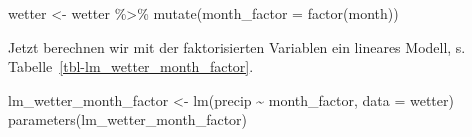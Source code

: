 \documentclass[
  letterpaper,
]{scrbook}
\newenvironment{Shaded}{\begin{snugshade}}{\end{snugshade}}
\newcommand{\AttributeTok}[1]{\textcolor[rgb]{0.40,0.45,0.13}{#1}}
\newcommand{\FunctionTok}[1]{\textcolor[rgb]{0.28,0.35,0.67}{#1}}
\newcommand{\NormalTok}[1]{\textcolor[rgb]{0.00,0.23,0.31}{#1}}
\newcommand{\OtherTok}[1]{\textcolor[rgb]{0.00,0.23,0.31}{#1}}
\newcommand{\SpecialCharTok}[1]{\textcolor[rgb]{0.37,0.37,0.37}{#1}}
\theoremstyle{definition}
\theoremstyle{definition}
\theoremstyle{definition}
\theoremstyle{remark}
\begin{document}
\begin{Shaded}
\begin{Highlighting}[]
\NormalTok{wetter }\OtherTok{\textless{}{-}}
\NormalTok{  wetter }\SpecialCharTok{\%\textgreater{}\%} 
  \FunctionTok{mutate}\NormalTok{(}\AttributeTok{month\_factor =} \FunctionTok{factor}\NormalTok{(month))}
\end{Highlighting}
\end{Shaded}

Jetzt berechnen wir mit der faktorisierten Variablen ein lineares
Modell, s. Tabelle~\ref{tbl-lm_wetter_month_factor}.

\begin{Shaded}
\begin{Highlighting}[]
\NormalTok{lm\_wetter\_month\_factor }\OtherTok{\textless{}{-}} \FunctionTok{lm}\NormalTok{(precip }\SpecialCharTok{\textasciitilde{}}\NormalTok{ month\_factor, }\AttributeTok{data =}\NormalTok{ wetter)}
\FunctionTok{parameters}\NormalTok{(lm\_wetter\_month\_factor)}
\end{Highlighting}
\end{Shaded}
\end{document}

